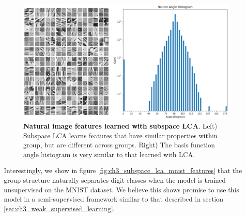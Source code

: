 \begin{figure}[h]
    \centering
    \includegraphics[width=\textwidth]{figures/subspace_lca_features.png}
    \caption{\textbf{Natural image features learned with subspace LCA}. Left) Subspace LCA learns features that have similar properties within group, but are different across groups. Right) The basis function angle histogram is very similar to that learned with LCA.}
    \label{fig:ch3_subspace_lca_features}
\end{figure}

Interestingly, we show in figure \ref{fig:ch3_subspace_lca_mnist_features} that the group structure naturally separates digit classes when the model is trained unsupervised on the MNIST dataset. We believe this shows promise to use this model in a semi-supervised framework similar to that described in section \ref{sec:ch3_weak_supervised_learning}.

